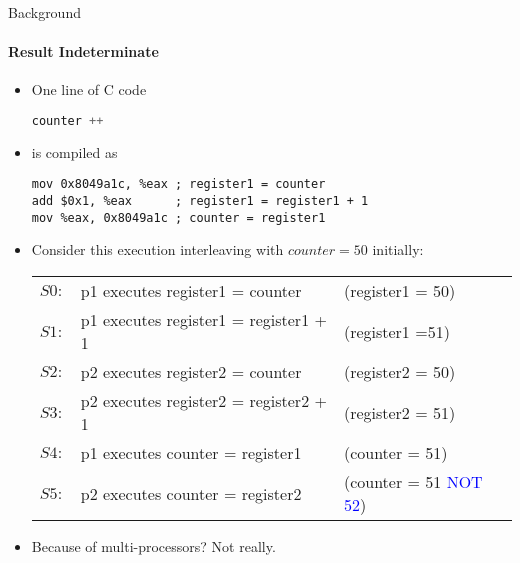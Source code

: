 \documentclass[10pt]{beamer}
\begin{document}
\begin{frame}[fragile]{Background}
\framesubtitle{Result Indeterminate}
\begin{itemize}
\item One line of C code
\begin{lstlisting}[language=C]
counter ++
\end{lstlisting}
\item is compiled as
\begin{uncoverenv}
\begin{lstlisting}[language={[x86masm]Assembler}] 
mov 0x8049a1c, %eax	; register1 = counter
add $0x1, %eax	    ; register1 = register1 + 1
mov %eax, 0x8049a1c	; counter = register1
\end{lstlisting}
\end{uncoverenv}
\item Consider this execution interleaving with $counter = 50$ initially:
\begin{uncoverenv}
\begin{table}
\scriptsize
\begin{tabular}{l l l}
$S0:$&p1 executes register1 = counter&(register1 = 50)\\
$S1:$&p1 executes register1 = register1 + 1&(register1 =51)\\
$S2:$&p2 executes register2 = counter&(register2 = 50)\\
$S3:$&p2 executes register2 = register2 + 1&(register2 = 51)\\
$S4:$&p1 executes counter = register1&(counter = 51)\\
$S5:$&p2 executes counter = register2&(counter = 51 \textcolor{blue}{NOT 52})\\
\end{tabular}
\end{table}
\end{uncoverenv}
\item Because of multi-processors? Not really.
\end{itemize}
\end{frame}
\end{document}
